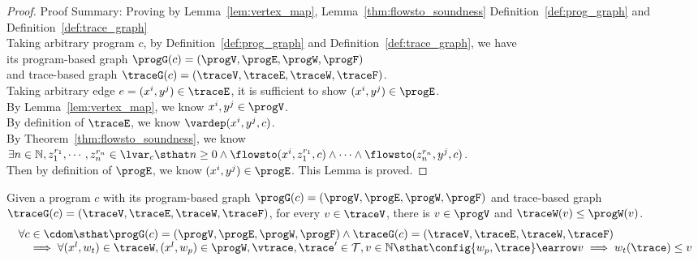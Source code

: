 \begin{proof}
Proof Summary: Proving by Lemma~\ref{lem:vertex_map}, Lemma~\ref{thm:flowsto_soundness} Definition~\ref{def:prog_graph} and Definition~\ref{def:trace_graph}
\\
Taking arbitrary program $c$,
by Definition~\ref{def:prog_graph} and Definition~\ref{def:trace_graph}, 
we have   
\\
its program-based graph $\progG({c}) = (\progV, \progE, \progW, \progF)$ 
\\
and 
trace-based graph $\traceG({c}) = (\traceV, \traceE, \traceW, \traceF)$.
\\
Taking arbitrary edge $e = (x^i, y^j) \in \traceE$, it is sufficient to show $(x^i, y^j) \in \progE$.
\\
By Lemma~\ref{lem:vertex_map}, we know $x^i, y^j \in \progV$.
\\
By definition of $\traceE$, we know $\vardep(x^i, y^j, c)$.
\\
By Theorem~\ref{thm:flowsto_soundness}, we know $ \exists n \in \mathbb{N}, z_1^{r_1}, \cdots, z_n^{r_n} \in \lvar_{{c}} \sthat  
n \geq 0 \land
\flowsto(x^i,  z_1^{r_1}, c) 
\land \cdots \land \flowsto(z_n^{r_n}, y^j, c) $.
\\
Then by definition of $\progE$, we know $(x^i, y^j) \in \progE$. This Lemma is proved.
\end{proof}
%
\begin{lem}
	\label{lem:weights_map}
	Given a program $c$ with its
	program-based graph $\progG({c}) = (\progV, \progE, \progW, \progF)$
	and 
	trace-based graph $\traceG({c}) = (\traceV, \traceE, \traceW, \traceF)$,
	for every $v \in \traceV$, there is $v \in \progV$ and $\traceW(v) \leq \progW(v)$.
	\[
		\begin{array}{l}
			\forall c \in \cdom 
			 \sthat  
			 \progG({c}) = (\progV, \progE, \progW, \progF)
			\land 
			\traceG({c}) = (\traceV, \traceE, \traceW, \traceF)
			\\ \quad
			\implies
			\forall (x^l, w_{t}) \in \traceW,
			(x^l, w_{p}) \in \progW, \vtrace, \trace' \in \mathcal{T}, v \in \mathbb{N} \sthat 
			\config{w_{p}, \trace} \earrow v
			\implies
			w_{t}(\trace) \leq v
		\end{array}
		\]
	\end{lem}
